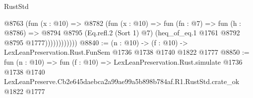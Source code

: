 \begin{lexlean}{RustStd}
\begin{coremodule}
                    @8763
                      (fun (x : @10) =>
                      @8782
                        (fun (x : @10) =>
                        fun (fn : @7) =>
                        fun (h : @8786) =>
                        @8794
                          @8795
                          (Eq.refl.{2} (Sort 1) @7)
                          (heq_of_eq.{1} @1761 @8792 @8795 @1777))))))))))))
@8840 := (n : @10) -> (f : @10) -> LexLeanPreservation.Rust.FunSem @1736 @1738 @1740 @1822 @1777
@8850 := fun (n : @10) =>
  fun (f : @10) =>
  LexLeanPreservation.Rust.simulate
    @1736
    @1738
    @1740
    LexLeanPreserve.Cb2e645daebca2a99ae99a5b898b784af.R1.RustStd.crate_ok
    @1822
    @1777
\end{coremodule}
\end{lexlean}
